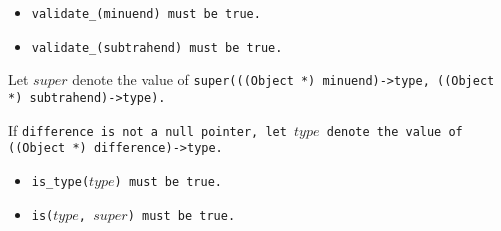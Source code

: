 \begin{itemize}

\item \tt{validate_(minuend)} must be \tt{true}.

\item \tt{validate_(subtrahend)} must be \tt{true}.

\end{itemize}

Let $super$ denote the value of
\tt{super(((Object *) minuend)->type, ((Object *) subtrahend)->type)}.

If \tt{difference} is not a null pointer, let $type$
denote the value of \tt{((Object *) difference)->type}.

\begin{itemize}

\item \tt{is_type(}$type$\tt{)} must be \tt{true}.

\item \tt{is(}$type$\tt{,} $super$\tt{)} must be \tt{true}.

\end{itemize}
